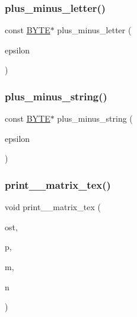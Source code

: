 \subsubsection{\texorpdfstring{plus\+\_\+minus\+\_\+letter()}{plus\_minus\_letter()}}
{\footnotesize\ttfamily const \mbox{\hyperlink{galois_8h_ab6cc7b4aeb6ea31aba2b3fbfc83ff5e6}{B\+Y\+TE}}$\ast$ plus\+\_\+minus\+\_\+letter (\begin{DoxyParamCaption}\item[{\mbox{\hyperlink{galois_8h_a09fddde158a3a20bd2dcadb609de11dc}{I\+NT}}}]{epsilon }\end{DoxyParamCaption})}

\mbox{\label{util_8_c_a9f5fa1b143db5ba897f3e3cc0dda146d}} 
\subsubsection{\texorpdfstring{plus\+\_\+minus\+\_\+string()}{plus\_minus\_string()}}
{\footnotesize\ttfamily const \mbox{\hyperlink{galois_8h_ab6cc7b4aeb6ea31aba2b3fbfc83ff5e6}{B\+Y\+TE}}$\ast$ plus\+\_\+minus\+\_\+string (\begin{DoxyParamCaption}\item[{\mbox{\hyperlink{galois_8h_a09fddde158a3a20bd2dcadb609de11dc}{I\+NT}}}]{epsilon }\end{DoxyParamCaption})}

\mbox{\label{util_8_c_a0c3004bd98030e363e8d8cd84daeb06e}} 
\subsubsection{\texorpdfstring{print\+\_\+\_\+matrix\+\_\+tex()}{print\_01\_matrix\_tex()}}
{\footnotesize\ttfamily void print\+\_\+\_\+matrix\+\_\+tex (\begin{DoxyParamCaption}\item[{ostream \&}]{ost,  }\item[{\mbox{\hyperlink{galois_8h_a09fddde158a3a20bd2dcadb609de11dc}{I\+NT}} $\ast$}]{p,  }\item[{\mbox{\hyperlink{galois_8h_a09fddde158a3a20bd2dcadb609de11dc}{I\+NT}}}]{m,  }\item[{\mbox{\hyperlink{galois_8h_a09fddde158a3a20bd2dcadb609de11dc}{I\+NT}}}]{n }\end{DoxyParamCaption})}

